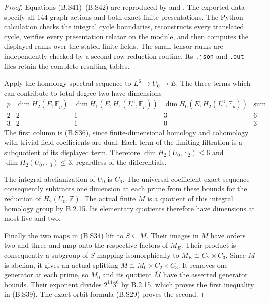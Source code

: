 \begin{proof}
Equations (B.S41)--(B.S42) are reproduced by
and
.
The exported data specify all 144 graph actions and
both exact finite presentations.  The Python calculation
checks the integral cycle boundaries, reconstructs every
translated cycle, verifies every presentation relator
on the module, and then computes the displayed ranks
over the stated finite fields.  The small tensor ranks
are independently checked by a second row-reduction
routine.  Its \texttt{.json} and \texttt{.out} files
retain the complete resulting tables.

Apply the homology spectral sequence to
$L^6\to U_0\to E$.  The three terms which can
contribute to total degree two have dimensions
\[
\begin{array}{c|c|c|c|c}
 p&\dim H_2(E,\mathbb F_p)&
 \dim H_1(E,H_1(L^6,\mathbb F_p))&
 \dim H_0(E,H_2(L^6,\mathbb F_p))&
 \text{sum}\\ \hline
 2&2&1&3&6\\
 3&2&1&0&3
\end{array}                                                     \tag{B.S43}
\]
The first column is (B.S36), since finite-dimensional
homology and cohomology with trivial field coefficients
are dual.  Each term of the limiting filtration is a
subquotient of its displayed term.  Therefore
$\dim H_2(U_0,\mathbb F_2)\leq6$ and
$\dim H_2(U_0,\mathbb F_3)\leq3$, regardless of
the differentials.

The integral abelianization of $U_0$ is $C_6$.
The universal-coefficient exact sequence consequently
subtracts one dimension at each prime from these
bounds for the reduction of $H_2(U_0,\mathbb Z)$.
The actual finite $M$ is a quotient of this integral
homology group by B.2.15.  Its elementary quotients
therefore have dimensions at most five and two.

Finally the two maps in (B.S34) lift to $S\subseteq M$.
Their images in $M$ have orders two and three and map
onto the respective factors of $M_E$.  Their product
is consequently a subgroup of $S$ mapping
isomorphically to $M_E\cong C_2\times C_3$.
Since $M$ is abelian, it gives an actual splitting
$M\cong M_0\times C_2\times C_3$.  It removes one
generator at each prime, so $M_0$ and its quotient
$\overline M$ have the asserted generator bounds.
Their exponent divides $2^{14}3^6$ by B.2.15, which
proves the first inequality in (B.S39).  The exact
orbit formula (B.S29) proves the second.
\end{proof}
